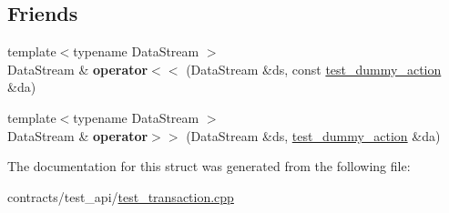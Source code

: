 \subsection*{Friends}
\begin{DoxyCompactItemize}
\item 
\mbox{\label{structtest__dummy__action_a4511487a7bb4964b62da4b82d03bea43}} 
{\footnotesize template$<$typename Data\+Stream $>$ }\\Data\+Stream \& {\bfseries operator$<$$<$} (Data\+Stream \&ds, const \mbox{\hyperlink{structtest__dummy__action}{test\+\_\+dummy\+\_\+action}} \&da)
\item 
\mbox{\label{structtest__dummy__action_a1e59827cec7ca937bb17cc2ca4d1b58d}} 
{\footnotesize template$<$typename Data\+Stream $>$ }\\Data\+Stream \& {\bfseries operator$>$$>$} (Data\+Stream \&ds, \mbox{\hyperlink{structtest__dummy__action}{test\+\_\+dummy\+\_\+action}} \&da)
\end{DoxyCompactItemize}


The documentation for this struct was generated from the following file\+:\begin{DoxyCompactItemize}
\item 
contracts/test\+\_\+api/\mbox{\hyperlink{test__transaction_8cpp}{test\+\_\+transaction.\+cpp}}\end{DoxyCompactItemize}
